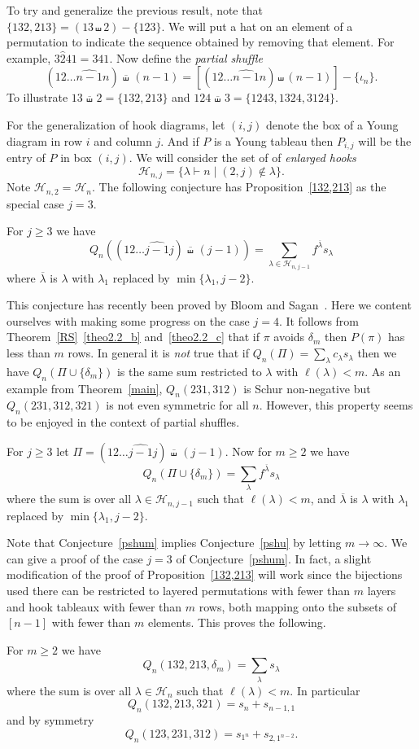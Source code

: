 \documentclass[ALCO,ThmDefs,Unicode,epreuves]{cedram}
\newcommand{\shu}{\shuffle}
\newcommand{\pshu}{\hspace{2pt}\ol{\shu}\hspace{2pt}}
\newcommand{\lab}{\ol{\la}}
\newcommand{\ol}{\overline}
\newcommand{\ptn}{\vdash}
\newcommand{\ra}{\rightarrow}
\newcommand{\de}{\delta}
\newcommand{\io}{\iota}
\newcommand{\la}{\lambda}
\newcommand{\cH}{{\mathcal H}}
\begin{document}
To try and generalize the previous result, note that $\{132,213\}=(13\shu 2) - \{123\}$. 
We will put a hat on an element of a permutation to indicate the sequence obtained by removing that element. For example, $3\hat{2}41=341$.
Now define the \emph{partial shuffle}
\[
(12\dots\widehat{n-1}n)\pshu (n-1) = [(12\dots\widehat{n-1}n)\shu (n-1)] - \{\io_n\}.
\]
To illustrate $13\pshu 2 = \{132,213\}$ and $124\pshu 3 = \{1243, 1324, 3124\}$. 

For the generalization of hook diagrams, let $(i,j)$ denote the box of a Young diagram in row $i$ and column $j$. 
And if $P$ is a Young tableau then $P_{i,j}$ will be the entry of $P$ in box $(i,j)$.
We will consider the set of of \emph{enlarged hooks}
\[
\cH_{n,j} = \{\la\ptn n \mid (2,j)\not\in\la\}.
\]
Note $\cH_{n,2}=\cH_n$. The following conjecture has Proposition~\ref{132,213} as the special case $j=3$.
\begin{conj}
\label{pshu}
For $j\ge3$ we have
\[
Q_n( (12\dots\widehat{j-1}j)\pshu (j-1) )=\sum_{\la\in\cH_{n,j-1}} f^{\lab} s_\la
\]
where $\lab$ is $\la$ with $\la_1$ replaced by $\min\{\la_1,j-2\}$.
\end{conj}


This conjecture has recently been proved by Bloom and Sagan~\cite{ajout}.  Here we content ourselves with making some progress on the case $j=4$.
It follows from Theorem~\ref{RS}~\eqref{theo2.2_b} and~\eqref{theo2.2_c} that if $\pi$ avoids $\de_m$ then $P(\pi)$ has less than $m$ rows. In general it is \emph{not} true that if $Q_n(\Pi)=\sum_\la c_\la s_\la$ then we have $Q_n(\Pi\cup \{\de_m\})$ is the same sum restricted to $\la$ with $\ell(\la)<m$. As an example from Theorem~\ref{main}, 
$Q_n(231,312)$ is Schur non-negative but $Q_n(231,312,321)$ is not even symmetric for all $n$. However, this property seems to be enjoyed in the context of partial shuffles.
\begin{conj}
\label{pshum}
For $j\ge3$ let $\Pi=(12\dots\widehat{j-1}j)\pshu (j-1)$. Now for $m\ge 2$ we have
\[
Q_n(\Pi \cup \{\de_m\})=\sum_\la f^{\lab} s_\la
\]
where the sum is over all $\la\in\cH_{n,j-1}$ such that $\ell(\la)<m$, and $\lab$ is $\la$ with $\la_1$ replaced by $\min\{\la_1,j-2\}$.
\end{conj}

Note that Conjecture~\ref{pshum} implies Conjecture~\ref{pshu} by letting $m\ra\infty$. 
We can give a proof of the case $j=3$ of Conjecture~\ref{pshum}. In fact, a slight modification of the proof of Proposition~\ref{132,213} will work since the bijections used there can be restricted to layered permutations with fewer than $m$ layers and hook tableaux with fewer than $m$ rows, both mapping onto the subsets of $[n-1]$ with fewer than $m$ elements. This proves the following.
\begin{prop} 
\label{132,321,delta}
For $m\ge2$ we have
\[
Q_n(132,213,\de_m)=\sum_\la s_\la
\]
where the sum is over all $\la\in\cH_n$ such that $\ell(\la)<m$. In particular
\[
Q_n(132,213,321)=s_n + s_{n-1,1}
\]
and by symmetry
\[
 Q_n(123,231,312)=s_{1^n} + s_{2,1^{n-2}}.
\]
\end{prop}
\end{document}
